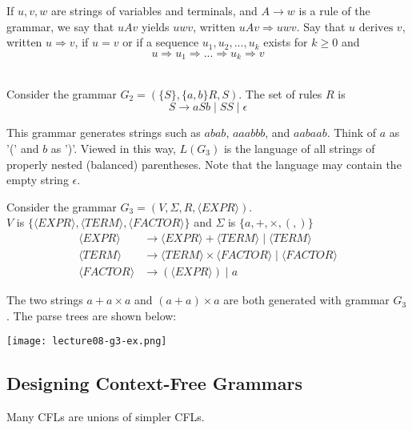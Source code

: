 \documentclass[11pt,a4paper]{article}
\begin{document}
If $u,v,w$ are strings of variables and terminals, and $A\rightarrow w$ is a rule of the grammar, we say that $uAv$ yields $uwv$, written $uAv\Rightarrow uwv$.
Say that $u\text{ derives } v$, written $u\Rightarrow v$, if $u=v$ or if a sequence $u_1,u_2,...,u_k$ exists for $k\geq 0$ and $$u\Rightarrow u_1\Rightarrow ...\Rightarrow u_k\Rightarrow v$$ \\


\begin{example}
    Consider the grammar $G_2=(\{S\},\{a,b\}R,S)$. The set of rules $R$ is $$S\rightarrow aSb\mid SS\mid\epsilon$$

    This grammar generates strings such as $abab$, $aaabbb$, and $aabaab$.
    Think of $a$ as '(' and $b$ as ')'. Viewed in this way, $L(G_3)$ is the language of all strings of properly nested (balanced) parentheses.
    Note that the language may contain the empty string $\epsilon$.
\end{example}

\begin{example}
    Consider the grammar $G_3=(V,\Sigma,R,\langle EXPR\rangle)$. \\

    $V$ is $\{\langle EXPR\rangle,\langle TERM\rangle,\langle FACTOR\rangle\}$ and $\Sigma$ is $\{a,+,\times, (, )\}$
    \begin{align*}
        \langle EXPR\rangle &\rightarrow\langle EXPR\rangle+\langle TERM\rangle\mid\langle TERM\rangle \\
        \langle TERM\rangle &\rightarrow\langle TERM\rangle\times\langle FACTOR\rangle\mid\langle FACTOR\rangle \\
        \langle FACTOR\rangle &\rightarrow (\langle EXPR\rangle)\mid a
    \end{align*}

    The two strings $a+a\times a$ and $(a+a)\times a$ are both generated with grammar $G_3$. The parse trees are shown below:

    \texttt{[image: lecture08-g3-ex.png]}
\end{example}

\subsection{Designing Context-Free Grammars}

Many CFLs are unions of simpler CFLs. \\
\end{document}

